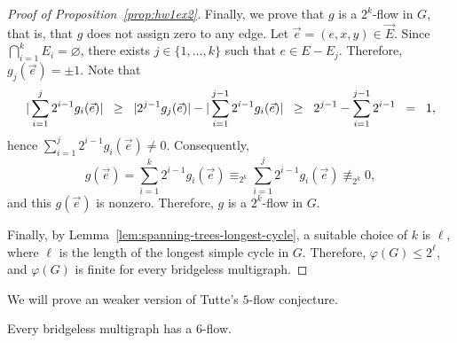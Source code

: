 \begin{proof}[Proof of Proposition~\ref{prop:hw1ex2}]
    Finally, we prove that \(g\) is a \(2^k\)-flow in \(G\), that is, that \(g\) does not assign zero to any edge.
    Let \(\vec{e} = (e, x, y) \in \vec{E}\).
    Since \(\bigcap_{i=1}^k E_i = \varnothing\), there exists \(j \in \{1, \ldots, k\}\) such that \(e \in E - E_j\).
    Therefore, \(g_j(\vec{e}) = \pm 1\).
    Note that
    \begin{equation}
        \thickmuskip=15mu
        |\sum_{i=1}^j 2^{i-1} g_i(\vec{e})| \geq |2^{j-1} g_j(\vec{e})| - |\sum_{i=1}^{j-1} 2^{i-1} g_i(\vec{e})| \geq 2^{j-1} - \sum_{i=1}^{j-1} 2^{i-1} = 1,
    \end{equation}
    hence \(\sum_{i=1}^j 2^{i-1} g_i(\vec{e}) \neq 0\).
    Consequently,
    \begin{equation}
        g(\vec{e}) = \sum_{i=1}^k 2^{i-1} g_i(\vec{e}) \equiv_{2^k} \sum_{i=1}^j 2^{i-1} g_i(\vec{e}) \not\equiv_{2^k} 0,
    \end{equation}
    and this \(g(\vec{e})\) is nonzero.
    Therefore, \(g\) is a \(2^k\)-flow in \(G\).

    Finally, by Lemma~\ref{lem:spanning-trees-longest-cycle},
    a suitable choice of \(k\) is \(\ell\),
    where \(\ell\) is the length of the longest simple cycle in \(G\).
    Therefore, \(\varphi(G) \leq 2^\ell\), and \(\varphi(G)\) is finite for every bridgeless multigraph.
\end{proof}

We will prove an weaker version of Tutte's \(5\)-flow conjecture.

\begin{theorem}
	Every bridgeless multigraph has a \(6\)-flow.
\end{theorem}

